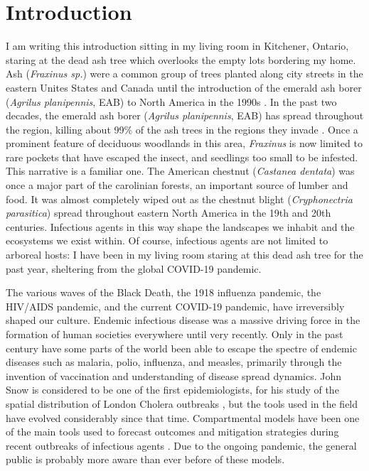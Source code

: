 \chapter{Introduction}

I am writing this introduction sitting in my living room in Kitchener, Ontario, staring at the dead ash tree which overlooks the empty lots bordering my home. Ash (\textit{Fraxinus sp.}) were a common group of trees planted along city streets in the eastern Unites States and Canada until the introduction of the emerald ash borer (\textit{Agrilus planipennis}, EAB) to North America in the 1990s \cite{nrcanmpb}. In the past two decades, the emerald ash borer (\textit{Agrilus planipennis}, EAB) has spread throughout the region, killing about 99\% of the ash trees in the regions they invade \cite{nrcaneab,herms2014emerald}. Once a prominent feature of deciduous woodlands in this area, \textit{Fraxinus} is now limited to rare pockets that have escaped the insect, and seedlings too small to be infested. This narrative is a familiar one. The American chestnut (\textit{Castanea dentata}) was once a major part of the carolinian forests, an important source of lumber and food. It was almost completely wiped out as the chestnut blight (\textit{Cryphonectria parasitica}) spread throughout eastern North America in the 19th and 20th centuries. Infectious agents in this way shape the landscapes we inhabit and the ecosystems we exist within. Of course, infectious agents are not limited to arboreal hosts: I have been in my living room staring at this dead ash tree for the past year, sheltering from the global COVID-19 pandemic. 

The various waves of the Black Death, the 1918 influenza pandemic, the HIV/AIDS pandemic, and the current COVID-19 pandemic, have irreversibly shaped our culture. Endemic infectious disease was a massive driving force in the formation of human societies everywhere until very recently. Only in the past century have some parts of the world been able to escape the spectre of endemic diseases such as malaria, polio, influenza, and measles, primarily through the invention of vaccination and understanding of disease spread dynamics. John Snow is considered to be one of the first epidemiologists, for his study of the spatial distribution of London Cholera outbreaks \cite{snow1855mode, brauer2019mathematical}, but the tools used in the field have evolved considerably since that time. Compartmental models have been one of the main tools used to forecast outcomes and mitigation strategies during recent outbreaks of infectious agents \cite{brauer2008compartmental}. Due to the ongoing pandemic, the general public is probably more aware than ever before of these models.

